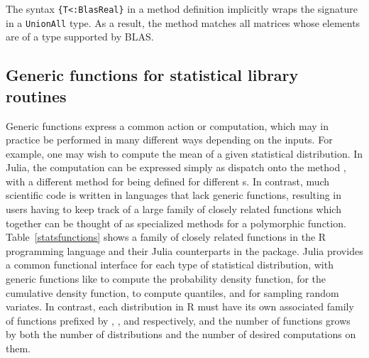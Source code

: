 \documentclass[10pt, preprint]{sigplanconf}
\begin{document}
The syntax \verb|{T<:BlasReal}| in a method definition implicitly wraps the
signature in a \verb|UnionAll| type. As a result, the method matches all
matrices whose elements are of a type supported by BLAS.


\subsection{Generic functions for statistical library routines}

Generic functions express a common action or computation, which may in
practice be performed in many different ways depending on the inputs. For
example, one may wish to compute the mean of a given statistical distribution.
In Julia, the computation can be expressed simply as dispatch onto the method
, with a different method for  being
defined for different s. In contrast, much scientific code
is written in languages that lack generic functions, resulting in users having
to keep track of a large family of closely related functions which
together can be thought of as specialized methods for a polymorphic function.
Table~\ref{statsfunctions} shows a family of closely related functions in the R
programming language and their Julia counterparts in the
 package. Julia provides a common functional interface
for each type of statistical distribution, with generic functions like
 to compute the probability density function,  for the
cumulative density function,  to compute quantiles, and
 for sampling random variates. In contrast, each distribution in R
must have its own associated family of functions prefixed by ,
,  and  respectively, and the number of functions grows
by both the number of distributions and the number of desired computations on
them.

\end{document}

